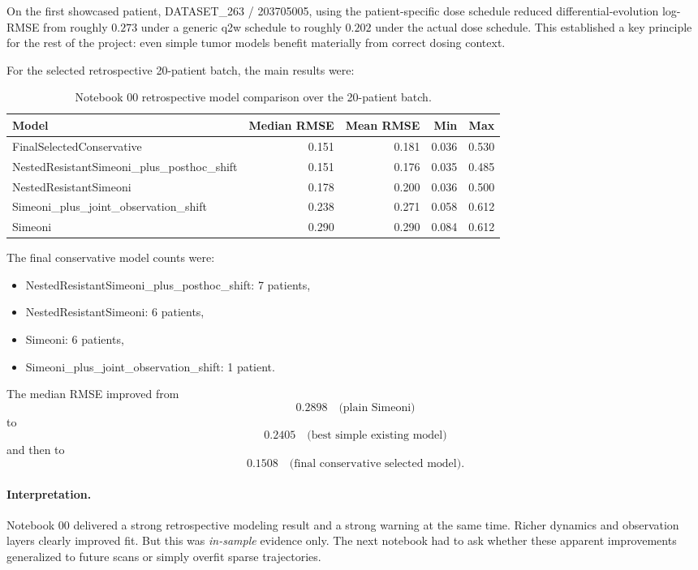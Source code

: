\documentclass[11pt,a4paper]{article}
\begin{document}
On the first showcased patient, DATASET\_263 / 203705005, using the patient-specific dose schedule reduced differential-evolution log-RMSE from roughly $0.273$ under a generic q2w schedule to roughly $0.202$ under the actual dose schedule. This established a key principle for the rest of the project: even simple tumor models benefit materially from correct dosing context.

For the selected retrospective 20-patient batch, the main results were:

\begin{table}[H]
\centering
\small
\caption{Notebook 00 retrospective model comparison over the 20-patient batch.}
\label{tab:n00-results}
\begin{tabular}{lrrrr}
\toprule
Model & Median RMSE & Mean RMSE & Min & Max \\
\midrule
FinalSelectedConservative & 0.151 & 0.181 & 0.036 & 0.530 \\
NestedResistantSimeoni\_plus\_posthoc\_shift & 0.151 & 0.176 & 0.035 & 0.485 \\
NestedResistantSimeoni & 0.178 & 0.200 & 0.036 & 0.500 \\
Simeoni\_plus\_joint\_observation\_shift & 0.238 & 0.271 & 0.058 & 0.612 \\
Simeoni & 0.290 & 0.290 & 0.084 & 0.612 \\
\bottomrule
\end{tabular}
\end{table}

The final conservative model counts were:
\begin{itemize}[leftmargin=2em]
    \item NestedResistantSimeoni\_plus\_posthoc\_shift: 7 patients,
    \item NestedResistantSimeoni: 6 patients,
    \item Simeoni: 6 patients,
    \item Simeoni\_plus\_joint\_observation\_shift: 1 patient.
\end{itemize}

The median RMSE improved from
\[
    0.2898 \quad \text{(plain Simeoni)}
\]
to
\[
    0.2405 \quad \text{(best simple existing model)}
\]
and then to
\[
    0.1508 \quad \text{(final conservative selected model)}.
\]

\paragraph{Interpretation.}
Notebook 00 delivered a strong retrospective modeling result and a strong warning at the same time. Richer dynamics and observation layers clearly improved fit. But this was \emph{in-sample} evidence only. The next notebook had to ask whether these apparent improvements generalized to future scans or simply overfit sparse trajectories.
\end{document}
